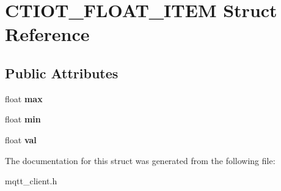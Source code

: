 \hypertarget{struct_c_t_i_o_t___f_l_o_a_t___i_t_e_m}{}\section{C\+T\+I\+O\+T\+\_\+\+F\+L\+O\+A\+T\+\_\+\+I\+T\+EM Struct Reference}
\label{struct_c_t_i_o_t___f_l_o_a_t___i_t_e_m}
\subsection*{Public Attributes}
\begin{DoxyCompactItemize}
\item 
\mbox{\label{struct_c_t_i_o_t___f_l_o_a_t___i_t_e_m_a47a2000b95c9405443c1fe51f8cfbae4}} 
float {\bfseries max}
\item 
\mbox{\label{struct_c_t_i_o_t___f_l_o_a_t___i_t_e_m_a9d2d7a7f02ba3fc8124dc93945f78597}} 
float {\bfseries min}
\item 
\mbox{\label{struct_c_t_i_o_t___f_l_o_a_t___i_t_e_m_aa9bee02027d32752cdb0b164b8426cd6}} 
float {\bfseries val}
\end{DoxyCompactItemize}


The documentation for this struct was generated from the following file\+:\begin{DoxyCompactItemize}
\item 
mqtt\+\_\+client.\+h\end{DoxyCompactItemize}

